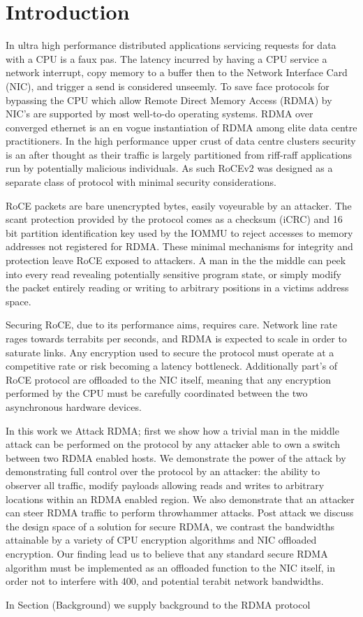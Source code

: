 \section{Introduction}
\label{sec:intro}

In ultra high performance distributed applications servicing requests for data
with a CPU is a faux pas. The latency incurred by having a CPU
service a network interrupt, copy memory to a buffer then to the Network
Interface Card (NIC), and trigger a send is considered unseemly. To save face
protocols for bypassing the CPU which allow Remote Direct Memory Access (RDMA)
by NIC's are supported by most well-to-do operating systems. RDMA over
converged ethernet is an en vogue instantiation of RDMA among elite data centre
practitioners. In the high performance upper crust of data centre clusters
security is an after thought as their traffic is largely partitioned from
riff-raff applications run by potentially malicious individuals. As such RoCEv2
was designed as a separate class of protocol with minimal security considerations.

RoCE packets are bare unencrypted bytes, easily voyeurable by an attacker. The
scant protection provided by the protocol comes as a checksum (iCRC) and 16 bit
partition identification key used by the IOMMU to reject accesses to memory
addresses not registered for RDMA. These minimal mechanisms for integrity and
protection leave RoCE exposed to attackers. A man in the the middle can peek
into every read revealing potentially sensitive program state, or simply modify
the packet entirely reading or writing to arbitrary positions in a victims
address space.

Securing RoCE, due to its performance aims, requires care. Network line rate
rages towards terrabits per seconds, and RDMA is expected to scale in order to
saturate links. Any encryption used to secure the protocol must operate at a
competitive rate or risk becoming a latency bottleneck. Additionally part's of
RoCE protocol are offloaded to the NIC itself, meaning that any encryption
performed by the CPU must be carefully coordinated between the two
asynchronous hardware devices.

In this work we Attack RDMA; first we show how a trivial man in the middle
attack can be performed on the protocol by any attacker able to own a switch
between two RDMA enabled hosts. We demonstrate the power of the attack by
demonstrating full control over the protocol by an attacker: the ability to
observer all traffic, modify payloads allowing reads and writes to arbitrary
locations within an RDMA enabled region. We also demonstrate that an attacker
can steer RDMA traffic to perform throwhammer attacks. Post attack we discuss
the design space of a solution for secure RDMA, we contrast the bandwidths
attainable by a variety of CPU encryption algorithms and NIC offloaded
encryption. Our finding lead us to believe that any standard secure RDMA
algorithm must be implemented as an offloaded function to the NIC itself, in
order not to interfere with 400, and potential terabit network bandwidths. 

In Section (Background) we supply background to the RDMA protocol



